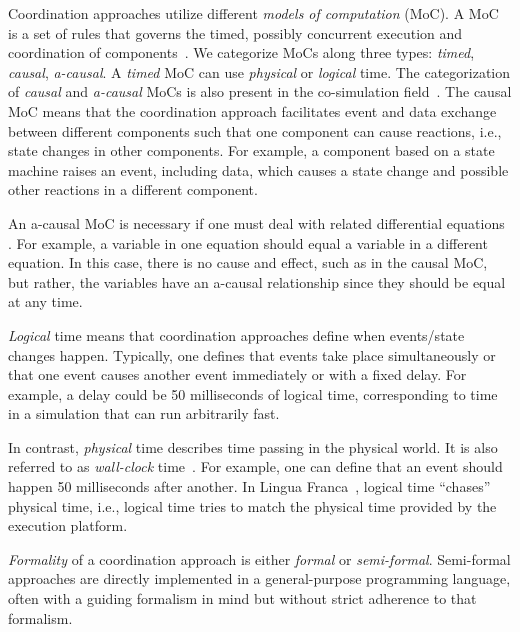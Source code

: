 \documentclass[runningheads]{llncs}
\newcommand{\quotes}[1]{``#1''}
\begin{document}
Coordination approaches utilize different \textit{models of computation} (MoC).
A MoC is a set of rules that governs the timed, possibly concurrent execution and coordination of components~\cite{ptolemaeusSystemDesignModeling2014}.
We categorize MoCs along three types: \textit{timed}, \textit{causal}, \textit{a-causal}.
A \textit{timed} MoC can use \textit{physical} or \textit{logical} time.
The categorization of \textit{causal} and \textit{a-causal} MoCs is also present in the co-simulation field~\cite{gomesCoSimulationSurvey2019}.
The causal MoC means that the coordination approach facilitates event and data exchange between different components such that one component can cause reactions, i.e., state changes in other components.
For example, a component based on a state machine raises an event, including data, which causes a state change and possible other reactions in a different component.

An a-causal MoC is necessary if one must deal with related differential equations \cite{lecoentGuaranteedCosimulationCyberphysical2020}.
For example, a variable in one equation should equal a variable in a different equation.
In this case, there is no cause and effect, such as in the causal MoC, but rather, the variables have an a-causal relationship since they should be equal at any time.

\textit{Logical} time means that coordination approaches define when events/state changes happen.
Typically, one defines that events take place simultaneously or that one event causes another event immediately or with a fixed delay.
For example, a delay could be 50 milliseconds of logical time, corresponding to time in a simulation that can run arbitrarily fast.

In contrast, \textit{physical} time describes time passing in the physical world.
It is also referred to as \textit{wall-clock} time~\cite{gomesCoSimulationSurvey2019}.
For example, one can define that an event should happen 50 milliseconds after another.
In Lingua Franca~\cite{lohstrohReactorsDeterministicModel2020}, logical time \quotes{chases} physical time, i.e., logical time tries to match the physical time provided by the execution platform.

\textit{Formality} of a coordination approach is either \textit{formal} or \textit{semi-formal}.
Semi-formal approaches are directly implemented in a general-purpose programming language, often with a guiding formalism in mind but without strict adherence to that formalism.
\end{document}
